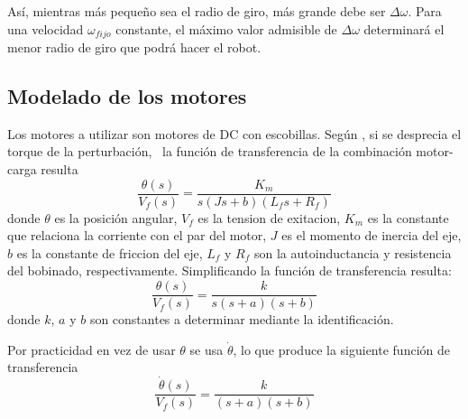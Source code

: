 \documentclass[10pt,conference,a4paper,onecolumn]{article}%
\begin{document}
Así, mientras más pequeño sea el radio de giro, más grande debe ser $\Delta \omega$. Para una velocidad $\omega_{fijo}$ constante, el máximo valor admisible de $\Delta \omega$ determinará el menor radio de giro que podrá hacer el robot.

 \subsection{Modelado de los motores}
 \label{modeloMotores}
 
 Los motores a utilizar son motores de DC con escobillas. Según \cite[pág. 58-59]{dorf}, si se desprecia el torque de la perturbación,%
\ la función de transferencia de la combinación motor-carga resulta
 \begin{equation*}
 \frac{\theta(s)}{V_f(s)}=\frac{K_m}{s(Js+b)(L_fs+R_f)}
 \end{equation*}
 donde $\theta$ es la posición angular, $V_f$ es la tension de exitacion, $K_m$ es la constante que relaciona la corriente con el par del motor, $J$ es el momento de inercia del eje, $b$ es la constante de friccion del eje, $L_f$  y $R_f$ son la autoinductancia y resistencia del bobinado, respectivamente. Simplificando la función de transferencia resulta:
 \begin{equation*}
 \frac{\theta(s)}{V_f(s)}=\frac{k}{s(s+a)(s+b)}
 \end{equation*}
 donde $k$, $a$ y $b$ son constantes a determinar mediante la identificación.
 
Por practicidad en vez de usar $\theta$ se usa $\dot{\theta}$, lo que produce la siguiente función de transferencia
 \begin{equation}
 \frac{\dot{\theta}(s)}{V_f(s)}=\frac{k}{(s+a)(s+b)}
 \end{equation}
  
\end{document}

